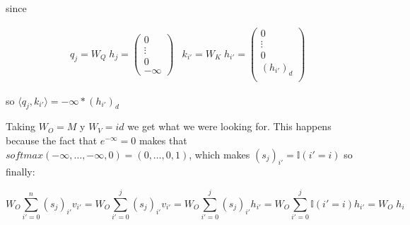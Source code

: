 since


\begin{align*}
    &q_{j} = W_Q \; h_j = \left(\begin{matrix}
        0 \\
        \vdots \\
        0 \\
        -\infty
    \end{matrix}\right)
    &k_{i'} = W_K \; h_{i'} = \left(\begin{matrix}
        0 \\
        \vdots \\
        0 \\
        (h_{i'})_{d} \\
    \end{matrix}\right)
\end{align*}

so $\langle q_{j}, k_{i'} \rangle = -\infty *(h_{i'})_{d}$

\bigskip

Taking $W_O = M$ y $W_V = id$ we get what we were looking for. This happens because the fact that $e^{-\infty} = 0$ makes that $softmax(-\infty, \dots, -\infty, 0) = (0, \dots, 0, 1)$, which makes $(s_j)_{i'} = \mathbb{I}(i' = i)$ so finally:

\[
  W_O \sum_{i'=0}^{n} (s_j)_{i'} v_{i'} = 
  W_O \sum_{i'=0}^{j} (s_j)_{i'} v_{i'} = 
  W_O \sum_{i'=0}^{j} (s_j)_{i'} h_{i'} = 
  W_O \sum_{i'=0}^{j} \mathbb{I}(i' = i) h_{i'} = 
  W_O \; h_i
\]















